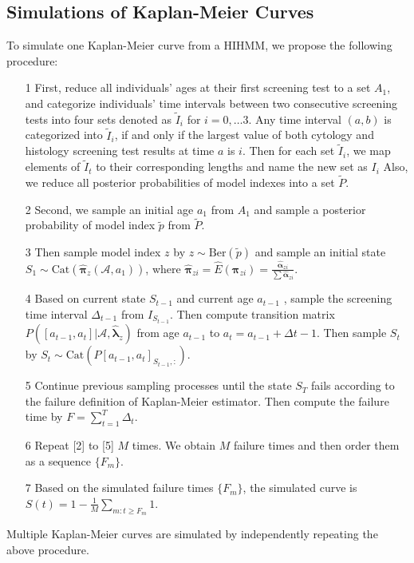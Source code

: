 \documentclass{article}
\begin{document}
\subsection{Simulations of Kaplan-Meier Curves}
To simulate one Kaplan-Meier curve from a HIHMM, we propose the following procedure:
\begin{itemize}
	\item[1] First, reduce all individuals' ages at their first screening test to a set $A_1$, and categorize individuals' time intervals between two consecutive screening tests into four sets denoted as $\tilde{I}_i$ for $i = 0,\ldots 3$. Any time interval $(a, b)$ is categorized into $\tilde{I}_i$, if and only if the largest value of both cytology and histology screening test results at time $a$ is $i$. Then for each set $\tilde{I}_i$, we map elements of $\tilde{I}_t$ to their corresponding lengths and name the new set as $I_i$  Also, we reduce all posterior probabilities of model indexes into a set $\tilde{P}$.
	\item[2] Second, we sample an initial age $a_1$ from $A_1$ and sample a posterior probability of model index $\tilde{p}$ from $\tilde{P}$.
	\item[3] Then sample model index $z$ by $z \sim \mathrm{Ber}(\tilde{p})$ and sample an initial state $S_1 \sim \mathrm{Cat}(\hat{\bm \pi}_z(\mathcal{A}, a_1))$, where $\hat{\bm \pi}_{zi} = \hat{E}(\bm \pi_{zi}) = \frac{\hat{\bm \alpha}_{zi}}{\sum \hat{\bm \alpha}_{zi}}$.
	\item[4] Based on current state $S_{t-1}$ and current age $a_{t-1}$ , sample the screening time interval $\Delta_{t-1}$ from $I_{S_{t-1}}$. Then compute transition matrix $P([a_{t-1}, a_{t}]| \mathcal{A}, \hat{\bm \lambda}_z)$ from age $a_{t-1}$ to $a_{t} = a_{t-1} + \Delta {t-1}$. Then sample $S_{t}$ by $S_{t} \sim \mathrm{Cat}(P[a_{t-1}, a_{t}]_{S_{t-1},:}) $.
	\item[5] Continue previous sampling processes until the state $S_T$ fails according to the failure definition of Kaplan-Meier estimator. Then compute the failure time by $F = \sum_{t = 1}^{T}\Delta_t$.
	\item[6] Repeat [2] to [5] $M$ times. We obtain $M$ failure times and then order them as a sequence $\{F_m\}$. 
	\item[7] Based on the simulated failure times $\{F_m\}$, the simulated curve is $S(t) = 1 - \frac{1}{M}\sum_{m: t \geq F_m}1$.
\end{itemize}
Multiple Kaplan-Meier curves are simulated by independently repeating the above procedure.
\end{document}
